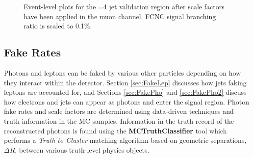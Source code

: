 \begin{figure}[h!]
\hfil 
{}
\caption{Event-level plots for the =4 jet validation region after scale factors have been applied in the muon channel.  FCNC signal branching ratio is scaled to 0.1\%.}
\label{fig:VR3mujpostscale}
\end{figure}
\subsection{Fake Rates}
\label{sec:Fakes}

Photons and leptons can be faked by various other particles depending on how they interact within the detector.  Section \ref{sec:FakeLep} discusses how jets faking leptons are accounted for, and Sections \ref{sec:FakePho} and \ref{sec:FakePho2} discuss how electrons and jets can appear as photons and enter the signal region.  Photon fake rates and scale factors are determined using data-driven techniques and truth information in the MC samples.  Information in the truth record of the reconstructed photons is found using the \textbf{MCTruthClassifier} tool which performs a \textit{Truth to Cluster} matching algorithm based on geometric separations, $\Delta R$, between various truth-level physics objects.

